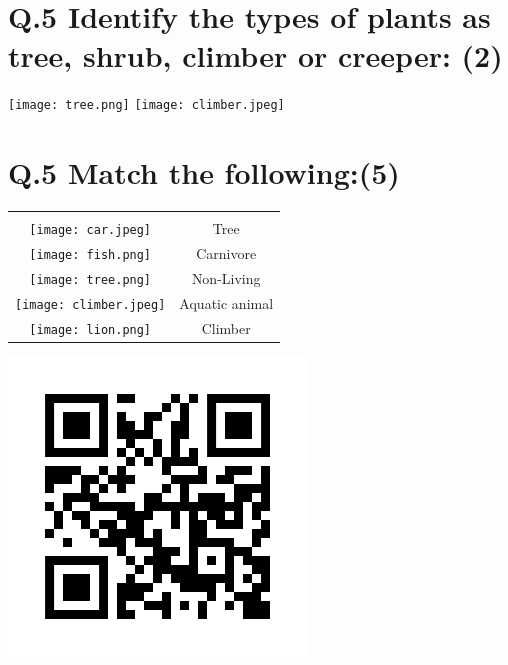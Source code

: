 \documentclass[12pt,a4paper]{article}
\begin{document}
\section*{Q.5 Identify the types of plants as tree, shrub, climber or creeper: (2)}
\begin{enumerate}
    \texttt{[image: tree.png]}\hspace{50}
    \texttt{[image: climber.jpeg]}\hspace{50}
\end{enumerate}
\section*{Q.5 Match the following:(5)}
\begin{enumerate}
\begin{table}[H]
\begin{flushleft}
\begin{tabular}{cc}
    \multicolumn{1}{c}{}\\
    \texttt{[image: car.jpeg]} & \hspace{80} Tree \\
    \texttt{[image: fish.png]} & \hspace{80} Carnivore \\
    \texttt{[image: tree.png]} & \hspace{80} Non-Living \\
    \texttt{[image: climber.jpeg]} & \hspace{80} Aquatic animal \\
    \texttt{[image: lion.png]} & \hspace{80} Climber
\end{tabular}
\end{flushleft}
\label{tab:multicol}
\end{table}
\end{enumerate}
\vfill
\begin{center}
\includegraphics[width=0.15\linewidth]{frame.png}\\
\caption{https://www.emroline.com}
\end{center}
\vspace{1cm}
\end{document}
